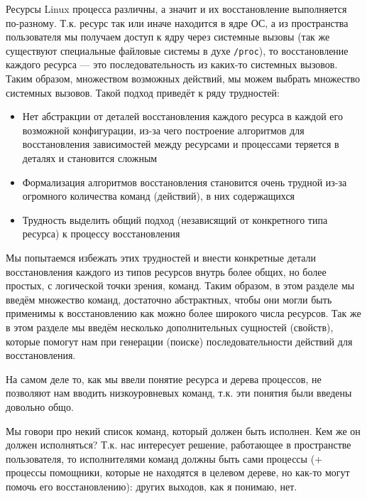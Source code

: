 Ресурсы Linux процесса различны, а значит и их восстановление выполняется по-разному. Т.к. ресурс так или иначе находится в ядре ОС, а из пространства пользователя мы получаем доступ к ядру через системные вызовы (так же существуют специальные файловые системы в духе \texttt{/proc}), то восстановление каждого ресурса --- это последовательность из каких-то системных вызовов. Таким образом, множеством возможных действий, мы можем выбрать множество системных вызовов. Такой подход приведёт к ряду трудностей:
\begin{itemize}
	\item Нет абстракции от деталей восстановления каждого ресурса в каждой его возможной конфигурации, из-за чего построение алгоритмов для восстановления зависимостей между ресурсами и процессами теряется в деталях и становится сложным
	\item Формализация алгоритмов восстановления становится очень трудной из-за огромного количества команд (действий), в них содержащихся
	\item Трудность выделить общий подход (независящий от конкретного типа ресурса) к процессу восстановления
\end{itemize}

Мы попытаемся избежать этих трудностей и внести конкретные детали восстановления каждого из типов ресурсов внутрь более общих, но более простых, с логической точки зрения, команд. Таким образом, в этом разделе мы введём множество команд, достаточно абстрактных, чтобы они могли быть применимы к восстановлению как можно более широкого числа ресурсов. Так же в этом разделе мы введём несколько дополнительных сущностей (свойств), которые помогут нам при генерации (поиске) последовательности действий для восстановления.

На самом деле то, как мы ввели понятие ресурса и дерева процессов, не позволяют нам вводить низкоуровневых команд, т.к. эти понятия были введены довольно общо.

\begin{note}
\label{note:evaluator}
Мы говори про некий список команд, который должен быть исполнен. Кем же он должен исполняться? Т.к. нас интересует решение, работающее в пространстве пользователя, то исполнителями команд должны быть сами процессы (+ процессы помощники, которые не находятся в целевом дереве, но как-то могут помочь его восстановлению): других выходов, как я понимаю, нет.
\end{note}

